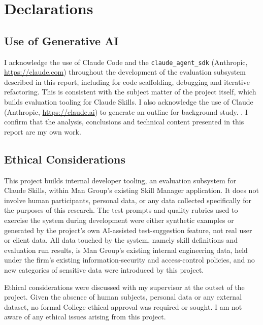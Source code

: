 \chapter*{Declarations}

\section*{Use of Generative AI}
I acknowledge the use of Claude Code and the \texttt{claude\_agent\_sdk} (Anthropic,
\url{https://claude.com}) throughout the development of the evaluation subsystem
described in this report, including for code scaffolding, debugging and iterative
refactoring. This is consistent with the subject matter of the project itself, which builds evaluation tooling for Claude
Skills. I also acknowledge the use of Claude (Anthropic, \url{https://claude.ai}) to generate an outline for background study. . I confirm that the analysis, conclusions and technical content presented in this report are my own work.


\section*{Ethical Considerations}
This project builds internal developer tooling, an evaluation subsystem for Claude
Skills, within Man Group's existing Skill Manager application. It does not involve
human participants, personal data, or any data collected specifically for the
purposes of this research. The test prompts and quality rubrics used to exercise
the system during development were either synthetic examples or generated by the
project's own AI-assisted test-suggestion feature, not real user or client data.
All data touched by the system, namely skill definitions and evaluation run
results, is Man Group's existing internal engineering data, held under the firm's
existing information-security and access-control policies, and no new categories of sensitive data were introduced by this project.

Ethical considerations were discussed with my supervisor at the outset of the
project. Given the absence of human subjects, personal data or any external
dataset, no formal College ethical approval was required or sought. I am not
aware of any ethical issues arising from this project.


